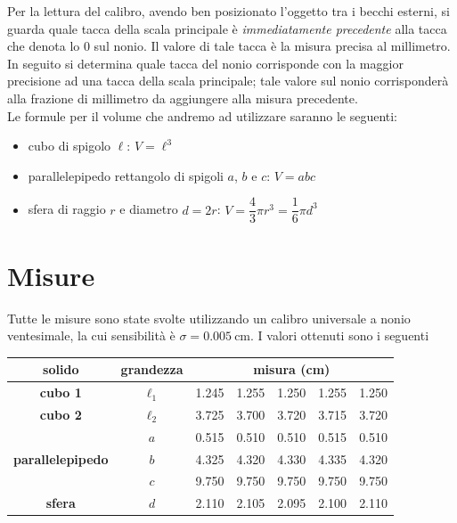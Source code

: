 \documentclass[12pt]{scrartcl}
\begin{document}
Per la lettura del calibro, avendo ben posizionato l'oggetto tra i becchi esterni,
si guarda quale tacca della scala principale è \emph{immediatamente precedente} alla
tacca che denota lo \(0\) sul nonio. Il valore di tale tacca è la misura precisa al
millimetro. In seguito si determina quale tacca del nonio corrisponde con la maggior
precisione ad una tacca della scala principale; tale valore sul nonio corrisponderà
alla frazione di millimetro da aggiungere alla misura precedente.\\[1em]
Le formule per il volume che andremo ad utilizzare saranno le seguenti:

\begin{itemize}
  \item cubo di spigolo \(\ell\):\hspace{5mm} \(V = \ell^3\)
  \item parallelepipedo rettangolo di spigoli \(a\), \(b\) e \(c\):\hspace{5mm} \(V = abc\)
  \item sfera di raggio \(r\) e diametro \(d = 2r\):\hspace{5mm} \(V = \dfrac{4}{3} \pi r^3 = \dfrac{1}{6} \pi d^3\)
\end{itemize}


\section{Misure}

Tutte le misure sono state svolte utilizzando un calibro universale a nonio ventesimale,
la cui sensibilità è \(\sigma = \SI{0.005}{\centi\metre}\). I valori ottenuti sono i seguenti

\begin{center}\begin{tabular}{ccccccc}
  \toprule
  \textbf{solido} & \textbf{grandezza} & \multicolumn{5}{c}{\textbf{misura} (\si{\centi\metre})} \\
  \midrule
  \textbf{cubo 1} & \(\ell_1\) & \num{1.245} & \num{1.255} & \num{1.250} & \num{1.255} & \num{1.250} \\
  \midrule
  \textbf{cubo 2} & \(\ell_2\) & \num{3.725} & \num{3.700} & \num{3.720} & \num{3.715} & \num{3.720} \\
  \midrule
  \multirow{3}{*}{\textbf{parallelepipedo}} & \(a\) & \num{0.515} & \num{0.510} & \num{0.510} & \num{0.515} & \num{0.510} \\
                                            & \(b\) & \num{4.325} & \num{4.320} & \num{4.330} & \num{4.335} & \num{4.320} \\
                                            & \(c\) & \num{9.750} & \num{9.750} & \num{9.750} & \num{9.750} & \num{9.750} \\
  \midrule
  \textbf{sfera} & \(d\) & \num{2.110} & \num{2.105} & \num{2.095} & \num{2.100} & \num{2.110} \\
  \bottomrule
\end{tabular}\end{center}
\end{document}
